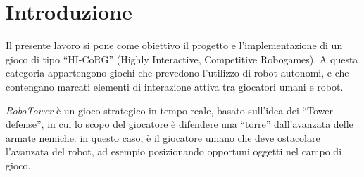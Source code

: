 \chapter{Introduzione}
\label{cap:introduzione}

Il presente lavoro si pone come obiettivo il progetto e l'implementazione di un gioco di tipo ``HI-CoRG'' (Highly Interactive, Competitive Robogames). A questa categoria appartengono giochi che prevedono l'utilizzo di robot autonomi, e che contengano marcati elementi di interazione attiva tra giocatori umani e robot.

\emph{RoboTower} è un gioco strategico in tempo reale, basato sull'idea dei ``Tower defense'', in cui lo scopo del giocatore è difendere una ``torre'' dall'avanzata delle armate nemiche: in questo caso, è il giocatore umano che deve ostacolare l'avanzata del robot, ad esempio posizionando opportuni oggetti nel campo di gioco.